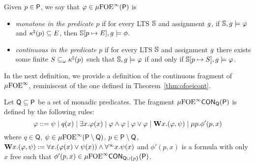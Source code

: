 %
%
\begin{definition}
Given $p \in \mathsf{P}$, we say that $\varphi \in \mu{\ensuremath{\mathrm{FOE}}}^\infty(\mathsf{P})$ is
\begin{itemize}
\item \emph{monotone in the predicate $p$} if for every LTS $\mathbb{S}$ and assignment $g$, if $\mathbb{S}, g \models \varphi$ and $\kappa^\natural(p) \subseteq E$, then $\mathbb{S}[p \mapsto E], g\models \phi$.

\item \emph{continuous in the predicate $p$} if for every LTS $\mathbb{S}$ and assignment $g$ there exists some finite $S \subseteq_\omega \kappa^\natural(p)$ such that $\mathbb{S}, g \models \varphi$ if and only if $\mathbb{S}[p \mapsto S], g \models \varphi$.
\end{itemize}
\end{definition}

In the next definition, we provide a definition of the continuous fragment of $\mu{\ensuremath{\mathrm{FOE}}}^\infty$, reminiscent of the one defined in Theorem~\ref{thm:ofoeicont}.
\begin{definition}
Let $\mathsf{Q}\subseteq \mathsf{P}$ be a set of monadic predicates. The fragment $\mu{\ensuremath{\mathrm{FOE}}}^\infty\mathsf{CON}_{\mathsf{Q}}(\mathsf{P})$ is defined by the following rules:
$$
\varphi ::= \psi \mid q(x) \mid \exists x.\varphi(x) \mid \varphi \land \varphi \mid \varphi \lor \varphi \mid \mathbf{W} x.(\varphi,\psi) \mid \mu p. \phi'(p, x)
$$
where $q \in \mathsf{Q}$, $\psi \in \mu{\ensuremath{\mathrm{FOE}}}^\infty(\mathsf{P}\setminus \mathsf{Q})$, $p \in \mathsf{P} \setminus \mathsf{Q}$, $\mathbf{W} x.(\varphi,\psi) := \forall x.(\varphi(x) \lor \psi(x)) \land \forall^\infty x.\psi(x)$ and $\phi'(p,x)$ is a formula with only $x$ free such that $\phi'(p,x) \in \mu{\ensuremath{\mathrm{FOE}}}^\infty\mathsf{CON}_{\mathsf{Q} \cup\{p\}}(\mathsf{P})$.

\end{definition}

